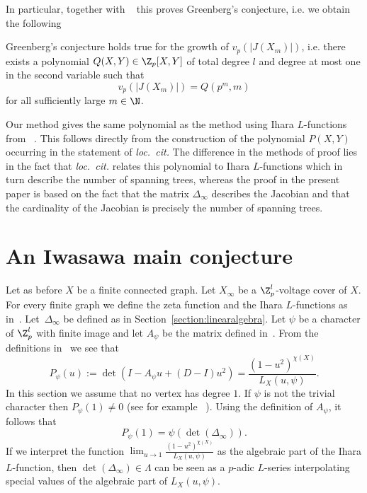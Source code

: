 In particular, together with ~\cite[Theorem 5.6]{monsky} this proves Greenberg's conjecture, i.e. we obtain the following 
\begin{thm}
	\label{thm:greenberg-conj}
	Greenberg's conjecture holds true for the growth of $v_p(|J(X_m)|)$, i.e. there exists a polynomial ${Q(X,Y) \in \Z_p[X,Y]}$ of total degree $l$ and degree at most one in the second variable such that 
	\[ v_p(|J(X_m)|) = Q(p^m,m) \] 
	for all sufficiently large ${m \in \N}$. 
\end{thm}
\begin{rema}
	Our method gives the same polynomial as the method using Ihara $L$-functions from ~\cite[Theorem~6.2]{dubose-vallieres}. This follows directly from the construction of the polynomial $P(X,Y)$ occurring in the statement of \emph{loc.~cit.} The difference in the methods of proof lies in the fact that \emph{loc.~cit.} relates this polynomial to Ihara $L$-functions which in turn describe the number of spanning trees, whereas the proof in the present paper is based on the fact that the matrix $\Delta_\infty$ describes the Jacobian and that the cardinality of the Jacobian is precisely the number of spanning trees. 
\end{rema}




\section{An Iwasawa main conjecture} \label{section:main_conjecture} 
Let as before $X$ be a finite connected graph. Let $X_\infty$ be a $\Z_p^l$-voltage cover of $X$. For every finite graph we define the zeta function and the Ihara $L$-functions as in~\cite{dubose-vallieres}.
Let~$\Delta_\infty$ be defined as in Section~\ref{section:linearalgebra}. Let $\psi$ be a character of $\Z_p^l$ with finite image and let $A_\psi$ be the matrix defined in~\cite{dubose-vallieres}. From the definitions in~\cite{dubose-vallieres} we see that 
\[P_{\psi}(u):=\det(I-A_\psi u+(D-I)u^2)=\frac{(1-u^2)^{\chi(X)}}{L_X(u,\psi)}.\]
In this section we assume that no vertex has degree $1$. If $\psi$ is not the trivial character then $P_\psi(1)\neq 0$ (see for example ~\cite[Section 5]{vallieres3}). Using the definition of $A_\psi$, it follows that
\[P_\psi(1)=\psi(\det(\Delta_\infty)).\]
If we interpret the function $\lim_{u\to 1}\frac{(1-u^2)^{\chi(X)}}{L_X(u,\psi)}$ as the algebraic part of the Ihara $L$-function, then $\det(\Delta_\infty)\in \Lambda$ can be seen as a $p$-adic $L$-series interpolating special values of the algebraic part of $L_X(u,\psi)$. 

